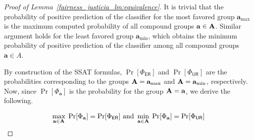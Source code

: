 \begin{proof}[Proof of Lemma~\ref{fairness_justicia_lm:equivalence}] 
	It is trivial that the probability of positive prediction of the classifier for the most favored group $ \mathbf{a}_{\max} $ is the maximum computed probability of all compound groups $ \mathbf{a} \in \mathbf{A} $. Similar argument holds for the least favored group $ \mathbf{a}_{\min} $, which obtains the minimum probability of positive prediction of the classifier among all compound groups $ \mathbf{a} \in A $.
	
	By construction of the SSAT formulas, $ \Pr[\Phi_{\mathsf{ER}}] $ and $ \Pr[\Phi_{\mathsf{UR}}] $ are the probabilities corresponding to the groups $ \mathbf{A} = \mathbf{a}_{\max} $ and $ \mathbf{A} = \mathbf{a}_{\min} $, respectively. Now, since $ \Pr[\Phi_{\mathbf{a}}] $ is the probability for the group $ \mathbf{A} = \mathbf{a} $, we derive the following.
	
	\begin{equation*}
	\begin{split}
	\max_{\mathbf{a} \in \mathbf{A}} \; \Pr[\Phi_{\mathbf{a}}] = \Pr[\Phi_{\mathsf{ER}}]
	\text{ and }
	\min_{\mathbf{a} \in \mathbf{A}} \; \Pr[\Phi_{\mathbf{a}}] = \Pr[\Phi_{\mathsf{UR}}]
	\end{split}
	\end{equation*}
\end{proof}


\iffalse
\begin{theorem}
	For an ER-SSAT problem, the na\"ive sample complexity is given by 
	\[ k = O\left(\frac{1}{\epsilon^2} (n + \ln(1/\delta))  \right)\]
	where $\widehat{p} - p \leq \epsilon$ with probability $1-\delta$.
\end{theorem}
\red{For a simple sampling based algo after evaluating $k$ assignments, the error between estimates probability and actual probability would differ by $\epsilon$ with probability $1- 2^{n+1} e^{-2\epsilon^2 k}$. So the sample complexity of a naive algo is $k = O(\epsilon^{-2} (\log(1/\delta) + n))$.}
\fi



